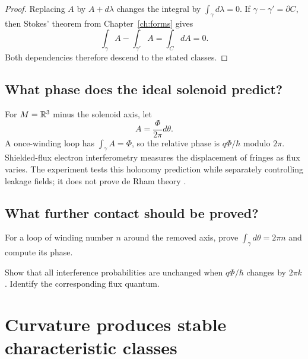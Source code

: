 \begin{proof}
Replacing $A$ by $A+d\lambda$ changes the integral by
$\int_\gamma d\lambda=0$.  If $\gamma-\gamma'=\partial C$, then Stokes'
theorem from Chapter~\ref{ch:forms} gives
\[
\int_\gamma A-\int_{\gamma'}A=\int_CdA=0.
\]
Both dependencies therefore descend to the stated classes.
\end{proof}

\section{What phase does the ideal solenoid predict?}

For $M=\mathbb R^3$ minus the solenoid axis, let
\[
A=\frac{\Phi}{2\pi}d\theta.
\]
A once-winding loop has $\int_\gamma A=\Phi$, so the relative phase is
$q\Phi/\hbar$ modulo $2\pi$.  Shielded-flux electron interferometry measures
the displacement of fringes as flux varies.  The experiment tests this
holonomy prediction while separately controlling leakage fields; it does not
prove de Rham theory \cite{aharonov-bohm,tonomura}.

\section{What further contact should be proved?}

\begin{exercise}
For a loop of winding number $n$ around the removed axis, prove
$\int_\gamma d\theta=2\pi n$ and compute its phase.
\end{exercise}

\begin{exercise}
Show that all interference probabilities are unchanged when
$q\Phi/\hbar$ changes by $2\pi k$.  Identify the corresponding flux quantum.
\end{exercise}


\chapter{Curvature produces stable characteristic classes}
\label{ch:chern}



